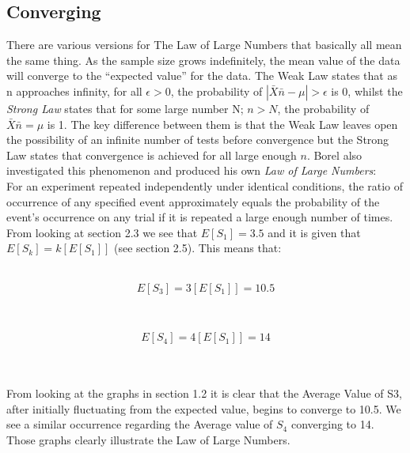 \documentclass[12pt]{article}
\begin{document}
\subsection{Converging}
There are various versions for The Law of Large Numbers that basically all mean the same thing. As the sample size grows indefinitely, the mean value of the data will converge to the “expected value” for the data.
The Weak Law states that as n approaches infinity, for all $\epsilon > 0$, the probability of $|\bar{X}\bar{n} - \mu|> \epsilon$ is 0, whilst the \emph{Strong Law} states that for some large number N; $n>N$, the probability of $\bar{X}\bar{n} = \mu$ is 1. The key difference between them is that the Weak Law leaves open the possibility of an infinite number of tests before convergence but the Strong Law states that convergence is achieved for all large enough $n$. Borel also investigated this phenomenon and produced his own \emph{Law of Large Numbers}:\\
For an experiment repeated independently under identical conditions, the ratio of occurrence of any specified event approximately equals the probability of the event's occurrence on any trial if it is repeated a large enough number of times.
\\
From looking at section 2.3 we see that $E[S_1] = 3.5$ and it is given that $E[S_k]=k[E[S_1]]$ (see section 2.5). This means that:
\\\\
\begin{minipage}{0.5\textwidth}
\begin{flushleft} 
$$E[S_3]=3[E[S_1]]=10.5$$
\end{flushleft}
\end{minipage}
~
\begin{minipage}{0.5\textwidth}
\begin{flushleft} 
$$E[S_4]=4[E[S_1]]=14$$
\end{flushleft}
\end{minipage}
\\\\
From looking at the graphs in section 1.2 it is clear that the Average Value of S3, after initially fluctuating from the expected value, begins to converge to 10.5. We see a similar occurrence regarding the Average value of $S_4$ converging to 14. Those graphs clearly illustrate the Law of Large Numbers.
\end{document}
